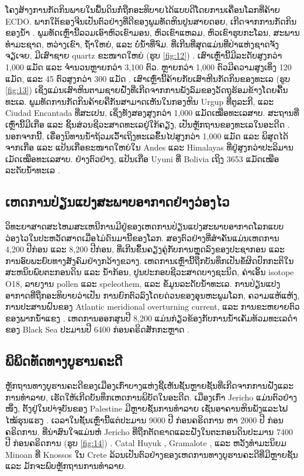 \documentclass[10pt,twocolumn,letterpaper]{article}
\begin{document}
ໂຄງສ້າງການກັດກິນພາຍໃນພື້ນດິນກໍ່ຖືກອະທິບາຍໄດ້ແບບດີໂດຍການເຄື່ອນໂລກທີ່ຄ້າຍ ECDO. ພາກໃຕ້ຂອງຈີນເປັນຕົວຢ່າງທີ່ດີຂອງພູມທັດຫິນປູນສາຍດອຍ, ເກີດຈາກການກັດກິນຂອງນໍ້າ \cite{82}. ພູມທັດເຫຼົ່ານີ້ລວມເອົາຫົວເຂົາມອນ, ຫົວເຂົາແຫລມ, ຫົວເຂົາຮູບກະໂລນ, ສະພານທໍາມະຊາດ, ຫວ່າງເຂົາ, ຖ້ຳໃຫຍ່, ແລະ ບໍ່ນໍ້າທີ່ຈົມ. ທີ່ເກີນທີ່ສຸດແມ່ນທີ່ປ່າແຫ່ງຊາດຈັງຈຽເຈຍ, ມີເສົາຊາຍ quartz ຂະໜາດໃຫຍ່ (ຮູບ \ref{fig:12}) \cite{84}. ເສົາເຫຼົ່ານີ້ມີລະດັບສູງກວ່າ 1,000 ແມັດ ແລະ ຈຳນວນຫຼາຍກວ່າ 3,100 ຕົວ. ຫຼາຍກວ່າ 1,000 ຕົວມີຄວາມສູງເທິ່ງ 120 ແມັດ, ແລະ 45 ຕົວສູງກວ່າ 300 ແມັດ \cite{85}. ເສົາເຫຼົ່ານີ້ຄ້າຍກັບເສົາຫີນກັດກິນຂອງທະເລ (ຮູບ \ref{fig:13}) ເຊິ່ງແມ່ນເສົາຫິນຕາມຊາຍຝັ່ງທີ່ເກີດຈາກການພັງລົມຂອງວັດຖຸຮ້ອມຂ້າງໂດຍຄື້ນທະເລ. ພູມທັດການກັດກິນຄ້າຍຄືກັນສາມາດເຫັນໃນກອງຫິນ Urgup ທີ່ຕູລະກີ, ແລະ Ciudad Encantada ທີ່ສະເປນ, ເຊິ່ງທັງສອງສູງກວ່າ 1,000 ແມັດເໝືອທະເລສາບ. ສະຖານທີ່ເຫຼົ່ານີ້ມີເກືອ ແລະ ຊິ້ນສ່ວນຊີວະສາດທະເລຢູ່ໃກ້ຄຽງ, ເປັນຫຼັກຖານຂອງທະເລໃນອະດີດ \cite{15,86,87}. ນອກຈາກນີ້, ເຣື່ອງນິທານນໍ້າຖ້ວມເວົ້າເຖິງທະເລຂຶ້ນໄປສູງກວ່າ 1,000 ແມັດ ແລະ ພິສູດໄດ້ຈາກເກືອ ແລະ ແປ້ນເກືອຂະໜາດໃຫຍ່ໃນ Andes ແລະ Himalayas ທີ່ຢູ່ສູງກວ່າປະລິມານເມັດເໝືອທະເລສາບ. ຢ່າງຕົວຢ່າງ, ແປ້ນເກືອ Uyuni ທີ່ Bolivia ເຖິງ 3653 ແມັດເໝືອລະດັບນໍ້າທະເລ \cite{94}.

\subsection{ເຫດການປ່ຽນແປງສະພາບອາກາດຢ່າງວ່ອງໄວ}

ວິທະຍາສາດສະໄຫມສະເຫນີການມີຢູ່ຂອງເຫດການປ່ຽນແປງສະພາບອາກາດໂລກແບບວ່ອງໄວໃນປະຫວັດສາດເມື່ອໄມ່ດົນມານີ້ຂອງໂລກ. ສອງຕົວຢ່າງທີ່ສຳຄັນແມ່ນເຫດການ 4,200 ປີກ່ອນ ແລະ 8,200 ປີກ່ອນ, ທີ່ເກີນຂຶ້ນຄຽງຄູ່ກັບການຫຼຸດລົງຂອງປະຊາກອນ ແລະ ການອົບພະຍົບທາງສັງຄົມຢ່າງກວ້າງຂວາງ. ເຫດການເຫຼົ່ານີ້ຖືກບັນທຶກເປັນຂໍ້ຜິດປົກກະຕິໃນສະຫນິບພົບຕະກອນດິນ ແລະ ນ້ຳກ້ອນ, ປູນປະກອບຊີວະສາດບາງຊະນິດ, ຄ່າເອິ້ນ isotope O18, ລາຍງານ pollen ແລະ speleothem, ແລະ ຂໍ້ມູນລະດັບນ້ຳທະເລ. ການປ່ຽນແປງອາກາດທີ່ຖືກອະທິບາຍວ່າເປັນ ການຍົກຕົວລົງໂດຍດ່ວນຂອງອຸນຫະພູມໂລກ, ຄວາມແຫ້ແຫ້ງ, ການປະສານຝົນຂອງ Atlantic meridional overturning current, ແລະ ການຂະຫຍາຍຕົວຂອງພາກນ້ຳແຂງ \cite{90,91,92}. ເຫດການອອກສູນປີ 8,200 ແມ່ນກ່ຽວຂ້ອງກັບການນໍ້າເຄັມທ້ວມທະເລດຳຂອງ Black Sea ປະມານປີ 6400 ກ່ອນຄຣິດສັກກະຫຼາດ \cite{93}.

\subsection{ພິພິດທັດທາງບູຮານຄະດີ}

ຫຼັກຖານທາງບູຮານຄະດີຂອງເມືອງເກົ່າບາງແຫ່ງຊີ້ເຫັນຊັ້ນຫຼາຍຊັ້ນທີ່ເກີດຈາກການຝັງແລະການທຳລາຍ, ເຮັດໃຫ້ເກີດບັນທຶກເຫດການພິບັດໃນອະດີດ. ເມືອງເກົ່າ Jericho ແມ່ນຕົວຢ່າງໜຶ່ງ, ຕັ້ງຢູ່ໃນປາ່ຈຸບັນຂອງ Palestine ມີຫຼາຍຊັ້ນການທຳລາຍ ເຊັ່ນອາຄານຫິນພັງແລະໄຟໄໝ້ຮຸນແຮງ \cite{96,97}. ເວລາໃນຊັ້ນເຫຼົ່ານີ້ແຕ່ປະມານ 9000 ປີ ກ່ອນຄຣິດການ ຫາ 2000 ປີ ກ່ອນຄຣິດການ. ທີ່ນ່າສົນໃຈແມ່ນຫໍ Jericho ທີ່ຖືກຕັດຂາດແລະຝັງໃນຕະກອນດິນປະມານ 7400 ປີ ກ່ອນຄຣິດການ (ຮູບ \ref{fig:14}) \cite{95}. Catal Huyuk \cite{99}, Gramalote \cite{98}, ແລະ ຫວັງທຳມະນິຍມ Minoan ທີ່ Knossos ໃນ Crete \cite{100,101} ລ້ວນເປັນຕົວຢ່າງຂອງເຫດການທາງບູຮານຄະດີທີ່ມີຫຼາຍຊັ້ນ ແລະ ມັກຈະພົບຫຼັກຖານການທຳລາຍ.
\end{document}
